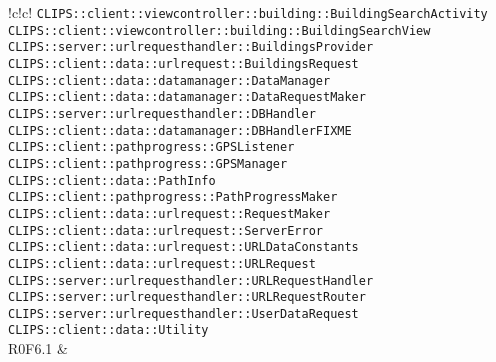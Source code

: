 \begin{tabella}{!{\VRule}c!{\VRule}c!{\VRule}}
{\texttt{CLIPS::client::viewcontroller::building::BuildingSearchActivity} \\ 
\texttt{CLIPS::client::viewcontroller::building::BuildingSearchView} \\ 
\texttt{CLIPS::server::urlrequesthandler::BuildingsProvider} \\ 
\texttt{CLIPS::client::data::urlrequest::BuildingsRequest} \\ 
\texttt{CLIPS::client::data::datamanager::DataManager} \\ 
\texttt{CLIPS::client::data::datamanager::DataRequestMaker} \\ 
\texttt{CLIPS::server::urlrequesthandler::DBHandler} \\ 
\texttt{CLIPS::client::data::datamanager::DBHandlerFIXME} \\ 
\texttt{CLIPS::client::pathprogress::GPSListener} \\ 
\texttt{CLIPS::client::pathprogress::GPSManager} \\ 
\texttt{CLIPS::client::data::PathInfo} \\ 
\texttt{CLIPS::client::pathprogress::PathProgressMaker} \\ 
\texttt{CLIPS::client::data::urlrequest::RequestMaker} \\ 
\texttt{CLIPS::client::data::urlrequest::ServerError} \\ 
\texttt{CLIPS::client::data::urlrequest::URLDataConstants} \\ 
\texttt{CLIPS::client::data::urlrequest::URLRequest} \\ 
\texttt{CLIPS::server::urlrequesthandler::URLRequestHandler} \\ 
\texttt{CLIPS::server::urlrequesthandler::URLRequestRouter} \\ 
\texttt{CLIPS::server::urlrequesthandler::UserDataRequest} \\ 
\texttt{CLIPS::client::data::Utility} } \\ 
R0F6.1 & 
\end{tabella}
